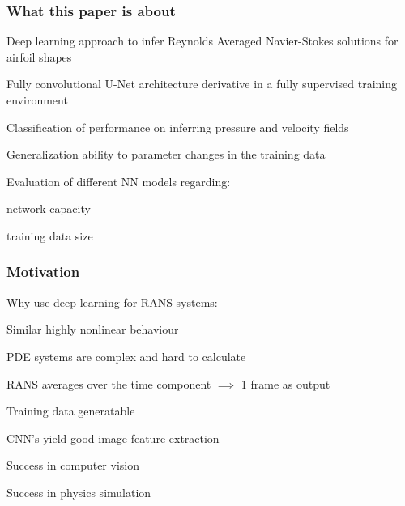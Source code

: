 \begin{frame}
    \frametitle{What this paper is about}
	\vspace*{0.8cm}

Deep learning approach to infer Reynolds Averaged Navier-Stokes \newline solutions for airfoil shapes

Fully convolutional U-Net architecture derivative in a fully \newline supervised training environment

Classification of performance on inferring pressure and velocity fields

Generalization ability to parameter changes in the training data

Evaluation of different NN models regarding:
\begin{PraesentationAufzaehlung}
    \item network capacity
    \item training data size
\end{PraesentationAufzaehlung}

\end{frame}
\clearpage

\begin{frame}
    \frametitle{Motivation}
	\vspace*{0.8cm}
	
Why use deep learning for RANS systems:

\begin{PraesentationAufzaehlung}
    \item Similar highly nonlinear behaviour
    \item PDE systems are complex and hard to calculate
    \item RANS averages over the time component \newline $\implies$ 1 frame as output
    \item Training data generatable
    \item CNN's yield good image feature extraction
    \item Success in computer vision
    \item Success in physics simulation
\end{PraesentationAufzaehlung}

\end{frame}
\clearpage
